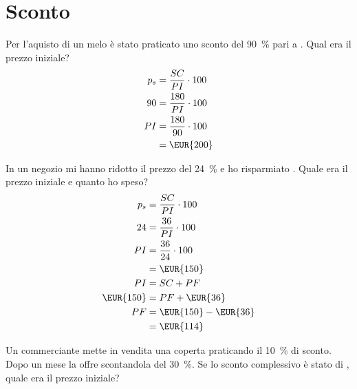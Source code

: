\section{Sconto}
\begin{exercise}
	Per l'aquisto di un melo è stato praticato uno sconto del  \SI{90}{\percent} pari a  . Qual era il prezzo iniziale?
	\tcblower
	\begin{align*}
		p_s={}&\dfrac{SC}{PI}\cdot 100\\
		90={}&\dfrac{180}{PI}\cdot 100\\
		PI={}&\dfrac{180}{90}\cdot 100\\
		={}&\mbox{\EUR{200}}
	\end{align*}
\end{exercise}
\begin{exercise}
In un negozio mi hanno ridotto il prezzo del  \SI{24}{\percent} e ho risparmiato . Quale era il prezzo iniziale e quanto ho speso?
	\tcblower
	\begin{align*}
		p_s={}&\dfrac{SC}{PI}\cdot 100\\
		24={}&\dfrac{36}{PI}\cdot 100\\
		PI={}&\dfrac{36}{24}\cdot 100\\
		={}&\mbox{\EUR{150}}\\
		PI={}&SC+PF\\
		\mbox{\EUR{150}}={}&PF+\mbox{\EUR{36}}\\
		PF={}&\mbox{\EUR{150}}-\mbox{\EUR{36}}\\
		={}&\mbox{\EUR{114}}\\
	\end{align*}
\end{exercise}
\begin{exercise}[no solution]
	Un commerciante mette in vendita una coperta praticando il \SI{10}{\percent} di sconto. Dopo un mese  la offre  scontandola del \SI{30}{\percent}. Se lo sconto complessivo è stato di , quale era il prezzo iniziale?
\end{exercise}
